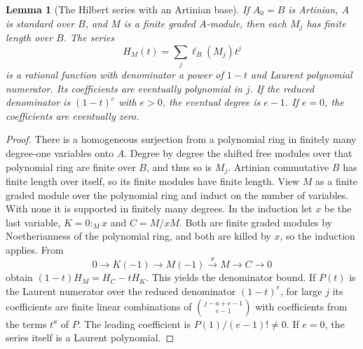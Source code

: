 \documentclass[11pt,oneside,openany]{book}
\newtheorem{lemma}[theorem]{Lemma}
\theoremstyle{definition}
\theoremstyle{remark}
\begin{document}
\begin{lemma}[The Hilbert series with an Artinian base]\label{p103:hilbert-serre-length}
If \(A_0=B\) is Artinian, \(A\) is standard over \(B\), and \(M\) is a finite graded \(A\)-module, then each \(M_j\) has finite length over \(B\). The series
\[
 H_M(t)=\sum_j \ell_B(M_j)t^j
\]
is a rational function with denominator a power of \(1-t\) and Laurent polynomial numerator. Its coefficients are eventually polynomial in \(j\). If the reduced denominator is \((1-t)^e\) with \(e>0\), the eventual degree is \(e-1\). If \(e=0\), the coefficients are eventually zero.
\end{lemma}
\begin{proof}
There is a homogeneous surjection from a polynomial ring in finitely many degree-one variables onto \(A\). Degree by degree the shifted free modules over that polynomial ring are finite over \(B\), and thus so is \(M_j\). Artinian commutative \(B\) has finite length over itself, so its finite modules have finite length. View \(M\) as a finite graded module over the polynomial ring and induct on the number of variables. With none it is supported in finitely many degrees. In the induction let \(x\) be the last variable, \(K=0:_M x\) and \(C=M/xM\). Both are finite graded modules by Noetherianness of the polynomial ring, and both are killed by \(x\), so the induction applies. From
\[
 0\longrightarrow K(-1)\longrightarrow M(-1)
   \xrightarrow{x} M\longrightarrow C\longrightarrow0
\]
obtain \((1-t)H_M=H_C-tH_K\). This yields the denominator bound. If \(P(t)\) is the Laurent numerator over the reduced denominator \((1-t)^e\), for large \(j\) its coefficients are finite linear combinations of \(\binom{j-a+e-1}{e-1}\) with coefficients from the terms \(t^a\) of \(P\). The leading coefficient is \(P(1)/(e-1)!\ne0\). If \(e=0\), the series itself is a Laurent polynomial.
\end{proof}
\end{document}
